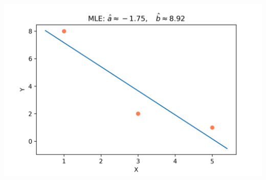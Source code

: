 \documentclass[10pt, physics]{homework}
\begin{document}
	\includegraphics[width=\textwidth]{3d}
	
\end{document}

